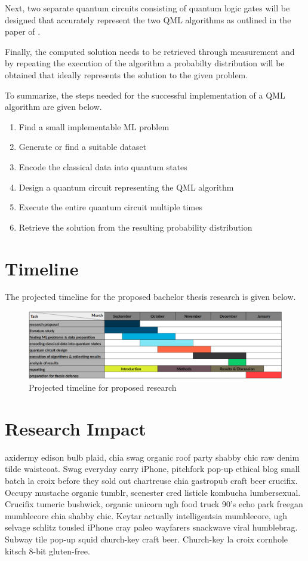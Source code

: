 \documentclass[a4paper]{article}
\newcommand*{\0}{$\ket{0}$}
\newcommand*{\1}{$\ket{1}$}
\begin{document}
Next, two separate quantum circuits consisting of quantum logic gates will be designed that accurately represent the two QML algorithms as outlined in the paper of \cite{Schuld2014, Schuld2016}.

Finally, the computed solution needs to be retrieved through measurement and by repeating the execution of the algorithm a probabilty distribution will be obtained that ideally represents the solution to the given problem.

To summarize, the steps needed for the successful implementation of a QML algorithm are given below.

\begin{enumerate}
\item Find a small implementable ML problem
\item Generate or find a suitable dataset
\item Encode the classical data into quantum states
\item Design a quantum circuit representing the QML algorithm
\item Execute the entire quantum circuit multiple times
\item Retrieve the solution from the resulting probability distribution
\end{enumerate}

\section{Timeline}
\label{sec:timeline}

The projected timeline for the proposed bachelor thesis research is given below.

\begin{figure}[!ht]
\centering
\includegraphics[scale=0.385]{ready_timeline.png}
\caption{Projected timeline for proposed research}
\end{figure}

\section{Research Impact}
\label{sec:research impact}
axidermy edison bulb plaid, chia swag organic roof party shabby chic raw denim tilde waistcoat. Swag everyday carry iPhone, pitchfork pop-up ethical blog small batch la croix before they sold out chartreuse chia gastropub craft beer crucifix. Occupy mustache organic tumblr, scenester cred listicle kombucha lumbersexual. Crucifix tumeric bushwick, organic unicorn ugh food truck 90's echo park freegan mumblecore chia shabby chic. Keytar actually intelligentsia mumblecore, ugh selvage schlitz tousled iPhone cray paleo wayfarers snackwave viral humblebrag. Subway tile pop-up squid church-key craft beer. Church-key la croix cornhole kitsch 8-bit gluten-free.
\end{document}
